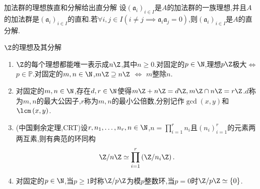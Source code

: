 \begin{remark}{加法群的理想族直和分解给出直分解}{}
	设$\left(\mathfrak{a}_{i}\right)_{i\in I}$是$A$的加法群的一族理想,并且$A$的加法群是$\left(\mathfrak{a}_{i}\right)_{i\in I}$的直和.若$\forall i,j\in I\left(i\neq j\implies \mathfrak{a}_{i}\mathfrak{a}_{j}=0\right)$,则$\left(\mathfrak{a}_{i}\right)_{i\in I}$是$A$的直分解.
\end{remark}

\begin{example}{$\Z$的理想及其分解}{}
	\begin{enumerate}
		\item $\Z$的每个理想都能唯一表示成$n\Z$,其中$n\geq 0$.对固定的$p\in\N$,理想$p\Z$极大$\iff$ $p\in\mathbb{P}$.对固定的$m,n\in\N$,$m\Z\supseteq n\Z$ $\iff$ $m$整除$n$.
		\item 对固定的$m,n\in\N$,存在$d,r\in\N$使得$m\Z+n\Z=d\Z,m\Z\cap n\Z=r\Z$.$d$称为$m,n$的最大公因子,$r$称为$m,n$的最小公倍数,分别记作$\gcd\left(x,y\right)$和$\lcm\left(x,y\right)$.
		\item (中国剩余定理,CRT)设$r,n_{1},\ldots,n_{r},n\in\N$,$n=\prod\limits_{i=1}^{r}n_{i}$且$\left(n_{i}\right)_{i=1}^{r}$的元素两两互素,则有典范的环同构
		\begin{align*}
			\Z/n\Z\simeq\prod\limits_{i=1}^{r}\left(\Z/n_{i}\Z\right).
		\end{align*}
		\item 对固定的$p\in\N$,当$p\geq 1$时称$\Z/p\Z$为模$p$整数环,当$p=0$时$\Z/p\Z\simeq\left\{0\right\}$.
	\end{enumerate}
\end{example}









